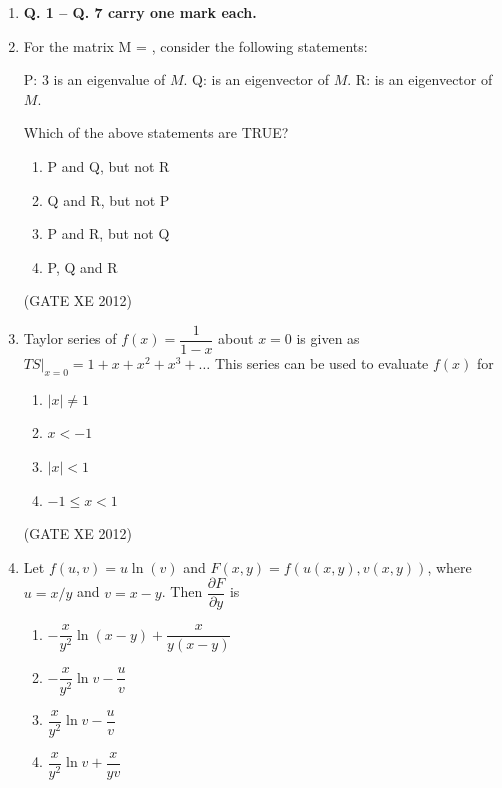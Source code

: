 \documentclass[12pt]{article}
\begin{document}
\begin{enumerate}

\item[] \textbf{ Q. 1 -- Q. 7 carry one mark each.}

\item For the matrix 
M = 
,
consider the following statements:  

P: 3 is an eigenvalue of $M$.  
Q:   is an eigenvector of $M$.  
R:   is an eigenvector of $M$.  

Which of the above statements are TRUE?  

\begin{multicols}{2}
\begin{enumerate}
\item P and Q, but not R  
\item Q and R, but not P  
\item P and R, but not Q  
\item P, Q and R
\end{enumerate}
\end{multicols}

(GATE XE 2012)

\item Taylor series of $f(x) = \dfrac{1}{1-x}$ about $x=0$ is given as  
$
TS|_{x=0} = 1 + x + x^2 + x^3 + \dots
$
This series can be used to evaluate $f(x)$ for  

\begin{multicols}{4}
\begin{enumerate}
\item $|x| \neq 1$  
\item $x < -1$  
\item $|x| < 1$  
\item $-1 \leq x < 1$
\end{enumerate}
\end{multicols}

(GATE XE 2012)

\item Let $f(u,v) = u \ln(v)$ and $F(x,y) = f(u(x,y), v(x,y))$, where $u = x/y$ and $v = x-y$.  
Then $\dfrac{\partial F}{\partial y}$ is  

\begin{multicols}{2}
\begin{enumerate}
\item $-\dfrac{x}{y^2}\ln(x-y) + \dfrac{x}{y(x-y)}$  
\item $-\dfrac{x}{y^2}\ln v - \dfrac{u}{v}$  
\item $\dfrac{x}{y^2}\ln v - \dfrac{u}{v}$  
\item $\dfrac{x}{y^2}\ln v + \dfrac{x}{yv}$
\end{enumerate}
\end{multicols}


\end{enumerate}
\end{document}
